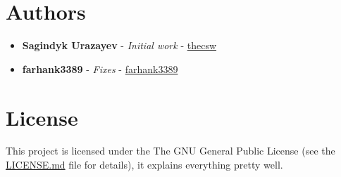 \documentclass[11pt]{article}
\begin{document}
\section{Authors}
\label{sec-6}
\begin{itemize}
\item \textbf{Sagindyk Urazayev} - \emph{Initial work} - \href{https://github.com/thecsw}{thecsw}
\item \textbf{farhank3389} - \emph{Fixes} - \href{https://github.com/farhank3389}{farhank3389}
\end{itemize}

\section{License}
\label{sec-7}

This project is licensed under the The GNU General Public License (see the
\href{https://github.com/thecsw/prequelmemes_bot/blob/master/LICENSE}{LICENSE.md} file for details), it explains everything pretty well. 
\end{document}
